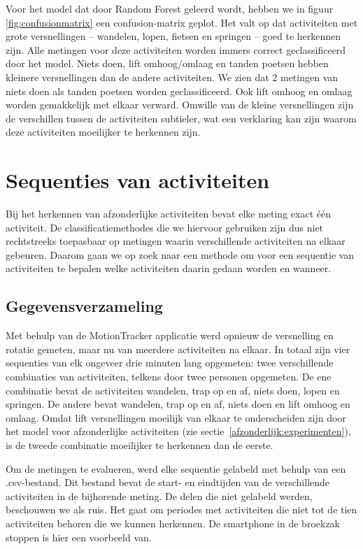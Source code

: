 \documentclass{article}
\begin{document}
Voor het model dat door Random Forest geleerd wordt, hebben we in figuur \ref{fig:confusionmatrix} een confusion-matrix geplot. Het valt op dat activiteiten met grote versnellingen -- wandelen, lopen, fietsen en springen -- goed te herkennen zijn. Alle metingen voor deze activiteiten worden immers correct geclassificeerd door het model. Niets doen, lift omhoog/omlaag en tanden poetsen hebben kleinere versnellingen dan de andere activiteiten. We zien dat 2 metingen van niets doen als tanden poetsen worden geclassificeerd. Ook lift omhoog en omlaag worden gemakkelijk met elkaar verward. Omwille van de kleine versnellingen zijn de verschillen tussen de activiteiten subtieler, wat een verklaring kan zijn waarom deze activiteiten moeilijker te herkennen zijn.





\section{Sequenties van activiteiten}

Bij het herkennen van afzonderlijke activiteiten bevat elke meting exact \'e\'en activiteit. De classificatiemethodes die we hiervoor gebruiken zijn dus niet rechtstreeks toepasbaar op metingen waarin verschillende activiteiten na elkaar gebeuren. Daarom gaan we op zoek naar een methode om voor een sequentie van activiteiten te bepalen welke activiteiten daarin gedaan worden en wanneer.

\subsection{Gegevensverzameling}

Met behulp van de MotionTracker applicatie werd opnieuw de versnelling en rotatie gemeten, maar nu van meerdere activiteiten na elkaar. In totaal zijn vier sequenties van elk ongeveer drie minuten lang opgemeten: twee verschillende combinaties van activiteiten, telkens door twee personen opgemeten. De ene combinatie bevat de activiteiten wandelen, trap op en af, niets doen, lopen en springen. De andere bevat wandelen, trap op en af, niets doen en lift omhoog en omlaag. Omdat lift versnellingen moeilijk van elkaar te onderscheiden zijn door het model voor afzonderlijke activiteiten (zie sectie~\ref{afzonderlijk:experimenten}), is de tweede combinatie moeilijker te herkennen dan de eerste.

Om de metingen te evalueren, werd elke sequentie gelabeld met behulp van een .csv-bestand. Dit bestand bevat de start- en eindtijden van de verschillende activiteiten in de bijhorende meting. De delen die niet gelabeld werden, beschouwen we als ruis. Het gaat om periodes met activiteiten die niet tot de tien activiteiten behoren die we kunnen herkennen. De smartphone in de broekzak stoppen is hier een voorbeeld van.
\end{document}
